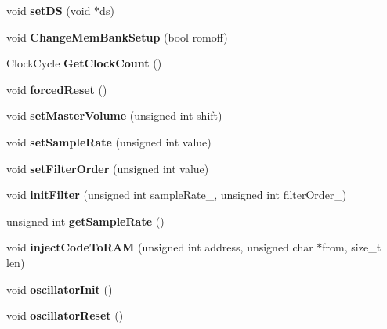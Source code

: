 \begin{DoxyCompactItemize}
void {\bfseries set\+DS} (void $\ast$ds)
\item 
\mbox{\label{class_t_e_d_a86b356a15fc18d5e8023b1f917d60123}} 
void {\bfseries Change\+Mem\+Bank\+Setup} (bool romoff)
\item 
\mbox{\label{class_t_e_d_ada6b14426fd4656909ffc18a8a423cb7}} 
Clock\+Cycle {\bfseries Get\+Clock\+Count} ()
\item 
\mbox{\label{class_t_e_d_ac4d074d94324ac93c2ccf73170d71952}} 
void {\bfseries forced\+Reset} ()
\item 
\mbox{\label{class_t_e_d_abb9b2cafe5ccf6a53882908ccc044366}} 
void {\bfseries set\+Master\+Volume} (unsigned int shift)
\item 
\mbox{\label{class_t_e_d_a208505f277f4bb5820c6f82b0122a626}} 
void {\bfseries set\+Sample\+Rate} (unsigned int value)
\item 
\mbox{\label{class_t_e_d_a2907986d292ea4b15d918846c0bb94ac}} 
void {\bfseries set\+Filter\+Order} (unsigned int value)
\item 
\mbox{\label{class_t_e_d_a8ba4e20af70bdf0e8849bdb0efeb9255}} 
void {\bfseries init\+Filter} (unsigned int sample\+Rate\+\_\+, unsigned int filter\+Order\+\_\+)
\item 
\mbox{\label{class_t_e_d_adc254a1973c36c32b29569dc76003dd6}} 
unsigned int {\bfseries get\+Sample\+Rate} ()
\item 
\mbox{\label{class_t_e_d_a5b1de1e5351aa9213f4b3b03c95545ee}} 
void {\bfseries inject\+Code\+To\+R\+AM} (unsigned int address, unsigned char $\ast$from, size\+\_\+t len)
\item 
\mbox{\label{class_t_e_d_aeb5e9b156c226c87914725bee45f6453}} 
void {\bfseries oscillator\+Init} ()
\item 
\mbox{\label{class_t_e_d_a9a648c64eb948542eda1588027e10973}} 
void {\bfseries oscillator\+Reset} ()
\item 
\mbox{\label{class_t_e_d_a09cc2042ea17f8d7a10b71070ea3d63e}} 

\end{DoxyCompactItemize}
